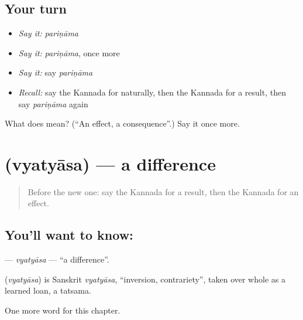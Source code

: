 \subsection*{Your turn}
\begin{itemize}
\raggedright
  \item \emph{Say it:} \emph{pariṇāma}
  \item \emph{Say it:} \emph{pariṇāma}, once more
  \item \emph{Say it:} say \emph{pariṇāma}
  \item \emph{Recall:} say the Kannada for naturally, then the Kannada for a result, then say \emph{pariṇāma} again
\end{itemize}

\begin{tcolorbox}[breakable,colback=teal!4,colframe=teal!35!black,title={Before you move on}]
What does  mean? (\textquotedblleft{}An effect, a consequence\textquotedblright{}.) Say it once more.
\end{tcolorbox}
\section[\texorpdfstring{\kn{ವ್ಯತ್ಯಾಸ} (vyatyāsa)}{ವ್ಯತ್ಯಾಸ (vyatyāsa)}]{ (vyatyāsa) — a difference}

\label{lesson:KA-C177-vyatyasa}



\begin{quote}
Before the new one: say the Kannada for a result, then the Kannada for an effect.
\end{quote}

\subsection*{You'll want to know: }
\textbf{} — \emph{vyatyāsa} — \textquotedblleft{}a difference\textquotedblright{}.

\begin{cousinweb}
\textbf{} (\emph{vyatyāsa}) is Sanskrit \emph{vyatyāsa}, \textquotedblleft{}inversion, contrariety\textquotedblright{}, taken over whole as a learned loan, a tatsama.
\end{cousinweb}

\begin{grammarlens}[title={What you've built}]
One more word for this chapter.
\end{grammarlens}

